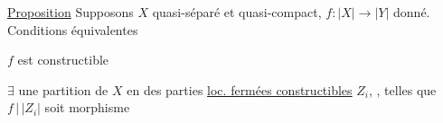 \uline{Proposition} Supposons $X$ quasi-séparé et quasi-compact, $f:|X|\longrightarrow|Y|$ donné. Conditions équivalentes

 $f$ est constructible

 $\exists$ une partition  de $X$ en des parties \uline{loc. fermées constructibles} $Z_i$, , telles que $f\,|\,|Z_i|$ soit morphisme

